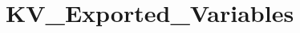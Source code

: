 \hypertarget{group___k_v___exported___variables}{}\section{K\+V\+\_\+\+Exported\+\_\+\+Variables}
\label{group___k_v___exported___variables}
